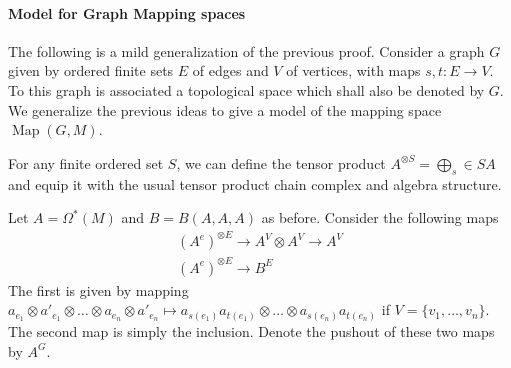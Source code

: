 \documentclass{scrartcl}
\theoremstyle{plain}
\theoremstyle{definition}
\DeclareMathOperator{\Map}{Map}
\begin{document}
\paragraph{Model for Graph Mapping spaces} The following is a mild generalization of the previous proof. Consider a graph $G$ given by ordered finite sets $E$ of edges and $V$ of vertices, with maps $s, t\colon E\to V$. To this graph is associated a topological space which shall also be denoted by $G$. We generalize the previous ideas to give a model of the mapping space $\Map(G, M)$. 

For any finite ordered set $S$, we can define the tensor product $A^{\otimes S} = \bigoplus_s\in S A$ and equip it with the usual tensor product chain complex and algebra structure.

Let $A=\Omega^*(M)$ and $B = B(A, A, A)$ as before. Consider the following maps
\begin{align*}
    (A^e)^{\otimes E} \to A^V\otimes A^V\to A^V \\
    (A^e)^{\otimes E}\to B^E
\end{align*}
The first is given by mapping $a_{e_1}\otimes a'_{e_1}\otimes\dots\otimes a_{e_n}\otimes a'_{e_n} \mapsto a_{s(e_1)} a_{t(e_1)}\otimes\dots\otimes a_{s(e_n)} a_{t(e_n)}$ if $V = \{v_1,\dots, v_n\}$. The second map is simply the inclusion. Denote the pushout of these two maps by $A^G$.
\end{document}
